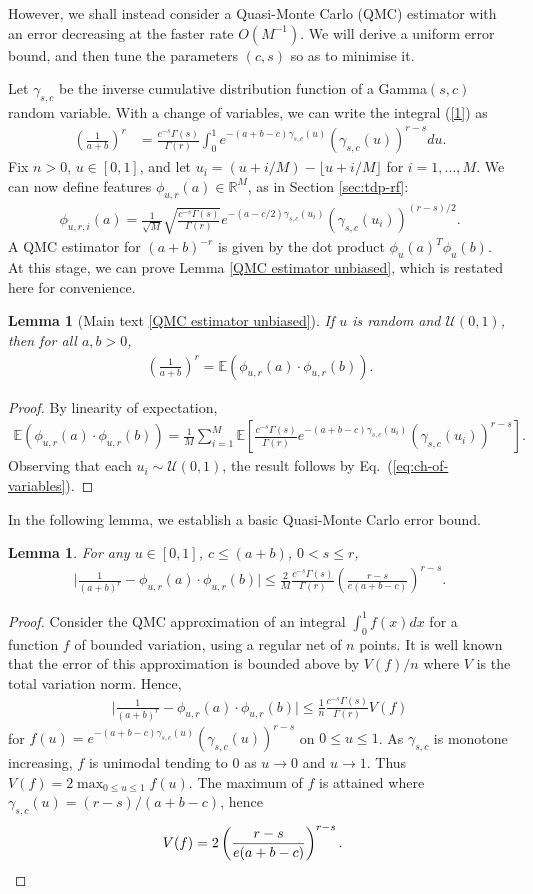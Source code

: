 \documentclass{article}
\theoremstyle{plain}
\newtheorem{lemma}[theorem]{Lemma}
\newtheorem*{lemma*}{Lemma}
\theoremstyle{definition}
\theoremstyle{remark}
\newcommand{\numeq}[1]{\begin{align}#1\end{align}}
\newcommand{\eq}[1]{\begin{align*}#1\end{align*}}
\newcommand{\E}{\mathbb{E}}
\newcommand{\R}{\mathbb{R}}
\begin{document}
However, we shall instead consider a Quasi-Monte Carlo (QMC) estimator with an error decreasing at the faster rate $O(M^{-1})$. We will derive a uniform error bound, and then tune the parameters $(c,s)$ so as to minimise it. 

Let $\gamma_{s,c}$ be the inverse cumulative distribution function of a Gamma$(s,c)$ random variable. With a change of variables, we can write the integral (\ref{1}) as 
\numeq{ \label{eq:ch-of-variables}
\left(\frac{1}{a+b}\right)^r 
& = \frac{c^{-s}\Gamma(s)}{\Gamma(r)} \int_0^1 e^{-(a+b-c)\gamma_{s,c}(u)} (\gamma_{s,c}(u))^{r-s}  du.
}
Fix $n>0$, $u\in[0,1]$, and let $u_i = (u + i/M)- \lfloor u + i/M \rfloor $ for $i=1,\dots,M$. We can now define features $\phi_{u,r}(a)\in \R^M$, as in Section \ref{sec:tdp-rf}:
\eq{
\phi_{u,r,i}(a) =\frac{1}{\sqrt M}\sqrt{\frac{c^{-s}\Gamma(s)}{\Gamma(r)} } e^{-(a-c/2)\gamma_{s,c}(u_i) }(\gamma_{s,c}(u_i))^{(r-s)/2}.
}
A QMC estimator for $(a+b)^{-r}$ is given by the dot product $\phi_u(a)^T \phi_u(b)$. At this stage, we can prove Lemma \ref{QMC estimator unbiased}, which is restated here for convenience.

\begin{lemma*}[Main text \ref{QMC estimator unbiased}]
If $u$ is random and $\mathcal U(0,1)$, then for all $a,b>0$,
\eq{
\left(\frac{1}{a+b}\right)^r = \E(\phi_{u,r}(a)\cdot \phi_{u,r}(b)).
}
\end{lemma*}
\begin{proof}
By linearity of expectation,
\eq{
\E(\phi_{u,r}(a)\cdot \phi_{u,r}(b)) = \frac{1}{M}\sum_{i=1}^M \E\left[\frac{c^{-s}\Gamma(s)}{\Gamma(r)}  e^{-(a+b-c)\gamma_{s,c}(u_i) }(\gamma_{s,c}(u_i))^{r-s} \right].
}
Observing that each $u_i\sim\mathcal U(0,1)$, the result follows by Eq.\ (\ref{eq:ch-of-variables}).
\end{proof}

In the following lemma, we establish a basic Quasi-Monte Carlo error bound.

\begin{lemma}\label{QMC basic lemma} 
For any $u\in[0,1]$, $c\leq (a+b)$, $0<s \le r $,
\eq{
\Big| \frac{1}{(a+b)^r} - \phi_{u,r}(a) \cdot \phi_{u,r}(b) \Big| \leq \frac{2}{M} \frac{c^{-s}\Gamma(s)}{\Gamma(r)} \left(\frac{r-s}{e(a+b-c)}\right)^{r-s}.
}
\end{lemma}

\begin{proof}
Consider the QMC approximation of an integral $\int_0^1 f(x)dx$ for a function $f$ of bounded variation, using a regular net of $n$ points. It is well known that the error of this approximation is bounded above by $V(f)/n$ where $V$ is the total variation norm. Hence, 
\eq{
\Big| \frac{1}{(a+b)^r} - \phi_{u,r}(a)\cdot \phi_{u,r}(b) \Big| \leq \frac{1}{n} \frac{c^{-s}\Gamma(s)}{\Gamma(r)} V(f)
}
for $f(u)= e^{-(a+b-c)\gamma_{s,c}(u)} (\gamma_{s,c}(u))^{r-s}$ on $0\leq u\leq 1$. As $\gamma_{s,c}$ is monotone increasing, $f$ is unimodal tending to $0$ as $u\to 0$ and $u\to 1$. Thus $V(f)=2\max_{0\le u\le 1} f(u)$.
The maximum of $f$ is attained where $\gamma_{s,c}(u)= (r-s)/(a+b-c)$, hence 
\eq{
V(f) = 2\left(\frac{r-s}{e(a+b-c)}\right)^{r-s}. & \qedhere
}
\end{proof}
\end{document}
